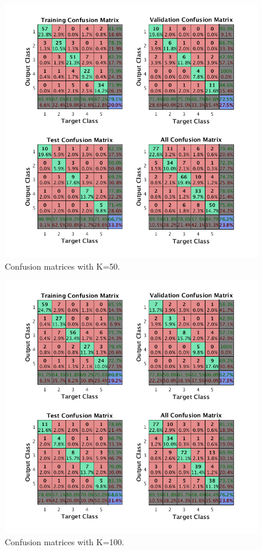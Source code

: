 \documentclass{article}
\begin{document}
\begin{figure}[h]
\centering
\includegraphics[scale=0.5]{Figures/Metrics/conf_k50}
\caption{Confusion matrices with K=50.}
\label{fig:k50}
\end{figure}
\begin{figure}[h]
\centering
\includegraphics[scale=0.5]{Figures/Metrics/conf_k100}
\caption{Confusion matrices with K=100.}
\label{fig:k100}
\end{figure}
\end{document}
